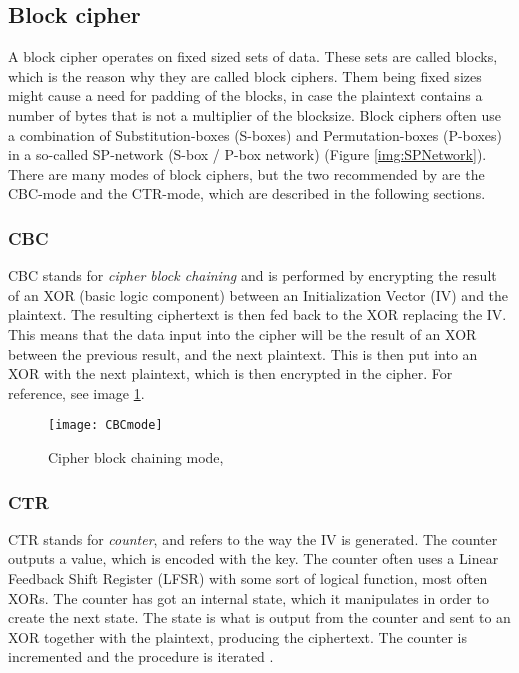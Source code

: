 \subsection{Block cipher}\label{sec:BlockCipher}
A block cipher operates on fixed sized sets of data. These sets are 
called blocks, which is the reason why they are called block ciphers. 
Them being fixed sizes might cause a need for padding of the blocks, in 
case the plaintext contains a number of bytes that is not a multiplier
of the blocksize. Block ciphers often use a combination of Substitution-boxes 
(S-boxes) and Permutation-boxes (P-boxes) in a so-called SP-network 
(S-box / P-box network) (Figure \ref{img:SPNetwork}). There are many modes 
of block ciphers, but the two recommended by \citet{Schneier:2003} are the 
CBC-mode and the CTR-mode, which are described in the following sections.

\subsubsection{CBC} \label{sec:cbc}
CBC stands for \emph{cipher block chaining} and is performed by 
encrypting the result of an XOR (basic logic component) between 
an Initialization Vector (IV) and the plaintext. The resulting 
ciphertext is then fed back to the XOR replacing the IV.
This means that the data input into the cipher will be the result of 
an XOR between the previous result, and the next plaintext. This is 
then put into an XOR with the next plaintext, which is then encrypted 
in the cipher. For reference, see image \ref{img:CBCmode}. 
\citep[pp. 109--111]{Stinson:2006}

\begin{figure}
  \begin{center}
   \texttt{[image: CBCmode]}
  \end{center}
  \caption{Cipher block chaining mode, \citep{CBCmode:2014}}
  \label{img:CBCmode}
\end{figure}

\subsubsection{CTR}
CTR stands for \emph{counter}, and refers to the way the IV is 
generated. The counter outputs a value, which is encoded with the key. 
The counter often uses a Linear Feedback Shift Register (LFSR) with some 
sort of logical function, most often XORs. The counter has got an internal
state, which it manipulates in order to create the next state. The state
is what is output from the counter and sent to an XOR together with the 
plaintext, producing the ciphertext. The counter is incremented and the 
procedure is iterated \citep[p. 111]{Stinson:2006}.

